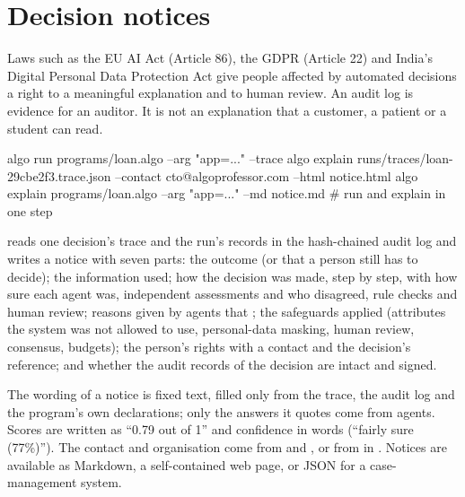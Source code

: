 \section{Decision notices}

Laws such as the EU AI Act (Article 86), the GDPR (Article 22) and India's Digital Personal Data Protection Act give people affected by automated decisions a right to a meaningful explanation and to human review. An audit log is evidence for an auditor. It is not an explanation that a customer, a patient or a student can read.

\begin{plaincode}[title=Command line]
algo run programs/loan.algo --arg "app=..." --trace
algo explain runs/traces/loan-29cbe2f3.trace.json --contact cto@algoprofessor.com --html notice.html
algo explain programs/loan.algo --arg "app=..." --md notice.md        # run and explain in one step
\end{plaincode}

 reads one decision's trace and the run's records in the hash-chained audit log and writes a notice with seven parts: the outcome (or that a person still has to decide); the information used; how the decision was made, step by step, with how sure each agent was, independent assessments and who disagreed, rule checks and human review; reasons given by agents that ; the safeguards applied (attributes the system was not allowed to use, personal-data masking, human review, consensus, budgets); the person's rights with a contact and the decision's reference; and whether the audit records of the decision are intact and signed.

The wording of a notice is fixed text, filled only from the trace, the audit log and the program's own declarations; only the answers it quotes come from agents. Scores are written as ``0.79 out of 1'' and confidence in words (``fairly sure (77\%)''). The contact and organisation come from  and , or from  in . Notices are available as Markdown, a self-contained web page, or JSON for a case-management system.
